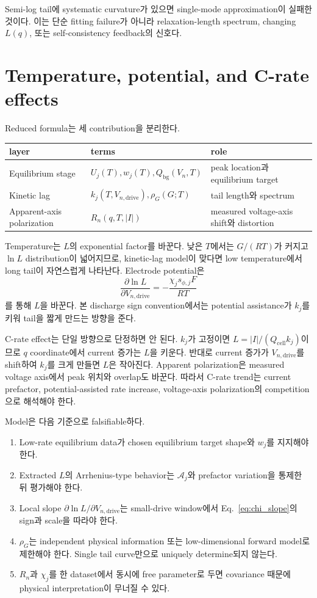 \documentclass[11pt,a4paper]{article}
\newcommand{\drive}{\mathrm{drive}}
\newcommand{\bg}{\mathrm{bg}}
\newcommand{\cell}{\mathrm{cell}}
\begin{document}
Semi-log tail에 systematic curvature가 있으면 single-mode approximation이 실패한 것이다. 이는 단순 fitting failure가 아니라
relaxation-length spectrum, changing $L(q)$, 또는 self-consistency feedback의 신호다.

\section{Temperature, potential, and C-rate effects}\label{sec:falsify}
Reduced formula는 세 contribution을 분리한다.
\begin{longtable}{p{} p{} p{}}
\toprule layer & terms & role \\ \midrule \endhead
Equilibrium stage & $U_j(T),w_j(T),Q_{\bg}(V_n,T)$ & peak location과 equilibrium target \\
Kinetic lag & $k_j(T,V_{n,\drive}),\rho_G(G;T)$ & tail length와 spectrum \\
Apparent-axis polarization & $R_n(q,T,|I|)$ & measured voltage-axis shift와 distortion \\
\bottomrule
\end{longtable}

Temperature는 $L$의 exponential factor를 바꾼다. 낮은 $T$에서는 $G/(RT)$가 커지고 $\ln L$ distribution이 넓어지므로,
kinetic-lag model이 맞다면 low temperature에서 long tail이 자연스럽게 나타난다. Electrode potential은
\begin{equation}
\frac{\partial\ln L}{\partial V_{n,\drive}}=-\frac{\chi_js_{\phi,j}F}{RT}
\end{equation}
를 통해 $L$을 바꾼다. 본 discharge sign convention에서는 potential assistance가 $k_j$를 키워 tail을 짧게 만드는 방향을 준다.

C-rate effect는 단일 방향으로 단정하면 안 된다. $k_j$가 고정이면 $L=|I|/(Q_{\cell}k_j)$이므로 $q$ coordinate에서 current 증가는
$L$을 키운다. 반대로 current 증가가 $V_{n,\drive}$를 shift하여 $k_j$를 크게 만들면 $L$은 작아진다. Apparent polarization은
measured voltage axis에서 peak 위치와 overlap도 바꾼다. 따라서 C-rate trend는 current prefactor, potential-assisted rate increase,
voltage-axis polarization의 competition으로 해석해야 한다.

Model은 다음 기준으로 falsifiable하다.
\begin{enumerate}[label=\textbf{N\arabic*.},leftmargin=2.4em]
\item Low-rate equilibrium data가 chosen equilibrium target shape와 $w_j$를 지지해야 한다.
\item Extracted $L$의 Arrhenius-type behavior는 $\mathcal A_j$와 prefactor variation을 통제한 뒤 평가해야 한다.
\item Local slope $\partial\ln L/\partial V_{n,\drive}$는 small-drive window에서 Eq.~\eqref{eq:chi_slope}의 sign과 scale을 따라야 한다.
\item $\rho_G$는 independent physical information 또는 low-dimensional forward model로 제한해야 한다. Single tail curve만으로 uniquely determine되지 않는다.
\item $R_n$과 $\chi_j$를 한 dataset에서 동시에 free parameter로 두면 covariance 때문에 physical interpretation이 무너질 수 있다.
\end{enumerate}
\end{document}
